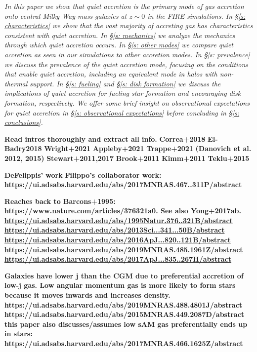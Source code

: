 \documentclass[fleqn,usenatbib]{mnras}
\begin{document}
\textit{
In this paper we show that quiet accretion is the primary mode of gas accretion onto central Milky Way-mass galaxies at $z \sim 0$ in the FIRE simulations.
In \S\ref{s: characteristics} we show that the vast majority of accreting gas has characteristics consistent with quiet accretion.
In \S\ref{s: mechanics} we analyze the mechanics through which quiet accretion occurs.
In \S\ref{s: other modes} we compare quiet accretion as seen in our simulations to other accretion modes.
In \S\ref{s: prevalence} we discuss the prevalence of the quiet accretion mode, focusing on the conditions that enable quiet accretion, including an equivalent mode in halos with non-thermal support.
In \S\ref{s: fueling} and \S\ref{s: disk formation} we discuss the implications of quiet accretion for fueling star formation and encouraging disk formation, respectively.
We offer some brief insight on observational expectations for quiet accretion in \S\ref{s: observational expectations} before concluding in \S\ref{s: conclusions}.
}

\textbf{Read intros thoroughly and extract all info.}
\textbf{Correa+2018}
\textbf{El-Badry2018}
\textbf{Wright+2021}
\textbf{Appleby+2021}
\textbf{Trappe+2021}
\textbf{(Danovich et al. 2012, 2015)}
\textbf{Stewart+2011,2017}
\textbf{Brook+2011}
\textbf{Kimm+2011}
\textbf{Teklu+2015}

\textbf{DeFelippis' work}
\textbf{
Filippo's collaborator work: https://ui.adsabs.harvard.edu/abs/2017MNRAS.467..311P/abstract
}

\cite{Huscher2020}
\cite{Rudie2019}

\textbf{
Reaches back to Barcons+1995: https://www.nature.com/articles/376321a0.
See also Yong+2017ab.
\url{https://ui.adsabs.harvard.edu/abs/1995Natur.376..321B/abstract}
\url{https://ui.adsabs.harvard.edu/abs/2013Sci...341...50B/abstract}
\url{https://ui.adsabs.harvard.edu/abs/2016ApJ...820..121B/abstract}
\url{https://ui.adsabs.harvard.edu/abs/2019MNRAS.485.1961Z/abstract}
\url{https://ui.adsabs.harvard.edu/abs/2017ApJ...835..267H/abstract}
}


\textbf{
Galaxies have lower j than the CGM due to preferential accretion of low-j gas.
Low angular momentum gas is more likely to form stars because it moves inwards and increases density.
https://ui.adsabs.harvard.edu/abs/2019MNRAS.488.4801J/abstract
https://ui.adsabs.harvard.edu/abs/2015MNRAS.449.2087D/abstract
this paper also discusses/assumes low sAM gas preferentially ends up in stars:
https://ui.adsabs.harvard.edu/abs/2017MNRAS.466.1625Z/abstract
}
\end{document}
